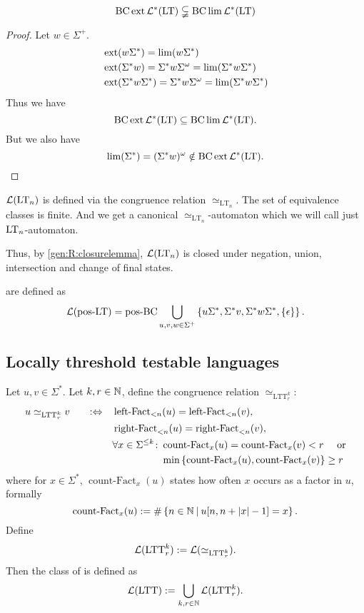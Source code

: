 \begin{theorem}
\[ \operatorname{BC} \operatorname{ext} \mathcal{L}^* (\textup{\textrm{LT}}) \subsetneqq \operatorname{BC} \lim \mathcal{L}^*(\textup{\textrm{LT}})  \]

\begin{proof}
Let $w \in \Sigma^+$.
\begin{align*}
& \operatorname{ext} (w \Sigma^*) = \lim(w \Sigma^*) \\
& \operatorname{ext}( \Sigma^* w) = \Sigma^* w \Sigma^\omega = \lim( \Sigma^* w \Sigma^* ) \\
& \operatorname{ext}( \Sigma^* w \Sigma^*) = \Sigma^* w \Sigma^\omega = \lim( \Sigma^* w \Sigma^* )
\end{align*}
Thus we have
\[ \operatorname{BC} \operatorname{ext} \mathcal{L}^* (\textup{\textrm{LT}}) \subseteq \operatorname{BC} \lim \mathcal{L}^*(\textup{\textrm{LT}}) . \]
But we also have
\[ \lim(\Sigma^*) = (\Sigma^* w)^\omega \notin \operatorname{BC} \operatorname{ext} \mathcal{L}^* (\textup{\textrm{LT}}) . \]
\end{proof}
\end{theorem}

$\mathcal{L}(\textup{\textrm{LT}}_n)$ is defined via the congruence relation $\simeq_{\text{LT}_n}$. The set of equivalence classes is finite. And we get a canonical $\simeq_{\text{LT}_n}$-automaton which we will call just $\textup{\textrm{LT}}_n$-automaton.

Thus, by \cref{gen:R:closurelemma}, $\mathcal{L}(\textup{\textrm{LT}}_n)$ is closed under negation, union, intersection and change of final states.

 are defined as
\[ \Lang(\mathtext{pos-LT}) = \operatorname{pos-BC} \bigcup_{u,v,w \in \Sigma^+} \Set{u\Sigma^*, \Sigma^* v, \Sigma^* w \Sigma^*, \Set{\epsilon}} . \]

\subsection{Locally threshold testable languages}
\label{lang:LTT}
Let $u,v \in \Sigma^*$. Let $k,r \in \mathbb{N}$, define the congruence relation $\simeq_{\text{LTT}^k_r}$:
\begin{alignat*}{3}
u \simeq_{\text{LTT}^k_r} v \ \ \ && :\Leftrightarrow \ \ \ & \operatorname{left-Fact}_{<n}(u) = \operatorname{left-Fact}_{<n}(v) , \\
&&& \operatorname{right-Fact}_{<n}(u) = \operatorname{right-Fact}_{<n}(v) , \\
&&& \begin{aligned}
\forall x \in \Sigma^{\le k} \colon & \operatorname{count-Fact}_x(u) = \operatorname{count-Fact}_x(v) < r \ \ \ \ \text{or} \\
& \min \Set{\operatorname{count-Fact}_x(u), \operatorname{count-Fact}_x(v)} \ge r
\end{aligned}
\end{alignat*}
where for $x \in \Sigma^*$, $\operatorname{count-Fact}_x(u)$ states how often $x$ occurs as a factor in $u$, formally
\[ \operatorname{count-Fact}_x(u) := \#\Set{n \in \N}{u[n,n+\vert x \vert - 1] = x} . \]
Define
\[ \mathcal{L}(\text{LTT}^k_r) := \mathcal{L}(\simeq_{\text{LTT}^k_r}). \]
Then the class of  is defined as
\[ \mathcal{L}(\textup{\textrm{LTT}}) := \bigcup_{k,r\in\mathbb{N}} \mathcal{L}(\text{LTT}^k_r) . \]

